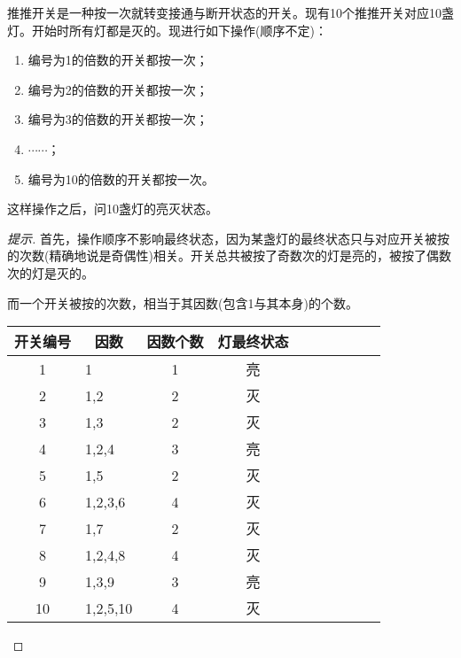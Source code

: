 \begin{example}
  推推开关是一种按一次就转变接通与断开状态的开关。现有10个推推开关对应10盏灯。开始时所有灯都是灭的。现进行如下操作(顺序不定)：
  \begin{enumerate}
  \item 编号为1的倍数的开关都按一次；
  \item 编号为2的倍数的开关都按一次；
  \item 编号为3的倍数的开关都按一次；
  \item $\cdots\cdots$；
  \item 编号为10的倍数的开关都按一次。
  \end{enumerate}
  这样操作之后，问10盏灯的亮灭状态。
\end{example}
\begin{proof}[提示]\let\qed\relax
  首先，操作顺序不影响最终状态，因为某盏灯的最终状态只与对应开关被按的次数(精确地说是奇偶性)相关。开关总共被按了奇数次的灯是亮的，被按了偶数次的灯是灭的。

  而一个开关被按的次数，相当于其因数(包含1与其本身)的个数。

  \centering
  \begin{tabular}{clcccccccc}
    \toprule
    开关编号 & \multicolumn{1}{c}{因数} & 因数个数 & 灯最终状态\\\midrule
    1        & 1    & 1        & 亮\\
    2        & 1,2  & 2        & 灭\\
    3        & 1,3  & 2        & 灭\\
    4        & 1,2,4& 3        & 亮\\
    5        & 1,5  & 2        & 灭\\
    6        & 1,2,3,6 & 4        & 灭\\
    7        & 1,7  & 2        & 灭\\
    8        & 1,2,4,8 & 4        & 灭\\
    9        & 1,3,9   & 3        & 亮\\
    10       & 1,2,5,10& 4        & 灭\\
    \bottomrule
  \end{tabular}
\end{proof}
